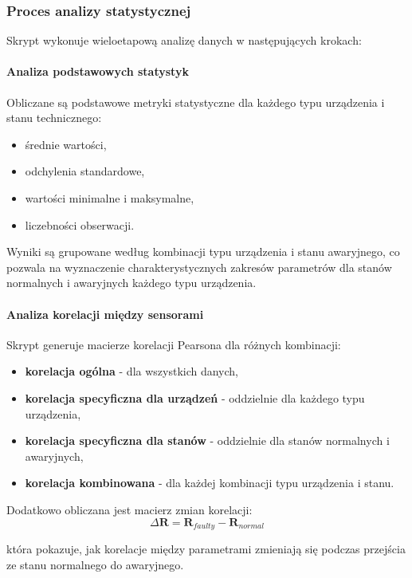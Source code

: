 \subsubsection{Proces analizy statystycznej}

Skrypt wykonuje wieloetapową analizę danych w następujących krokach:

\paragraph{Analiza podstawowych statystyk}
Obliczane są podstawowe metryki statystyczne dla każdego typu urządzenia i stanu technicznego:
\begin{itemize}
    \item średnie wartości,
    \item odchylenia standardowe,
    \item wartości minimalne i maksymalne,
    \item liczebności obserwacji.
\end{itemize}

Wyniki są grupowane według kombinacji typu urządzenia i stanu awaryjnego, co pozwala na wyznaczenie charakterystycznych zakresów parametrów dla stanów normalnych i awaryjnych każdego typu urządzenia.

\paragraph{Analiza korelacji między sensorami}
Skrypt generuje macierze korelacji Pearsona dla różnych kombinacji:
\begin{itemize}
    \item \textbf{korelacja ogólna} - dla wszystkich danych,
    \item \textbf{korelacja specyficzna dla urządzeń} - oddzielnie dla każdego typu urządzenia,
    \item \textbf{korelacja specyficzna dla stanów} - oddzielnie dla stanów normalnych i awaryjnych,
    \item \textbf{korelacja kombinowana} - dla każdej kombinacji typu urządzenia i stanu.
\end{itemize}

Dodatkowo obliczana jest macierz zmian korelacji:
$$\Delta\mathbf{R} = \mathbf{R}_{faulty} - \mathbf{R}_{normal}$$

która pokazuje, jak korelacje między parametrami zmieniają się podczas przejścia ze stanu normalnego do awaryjnego.

